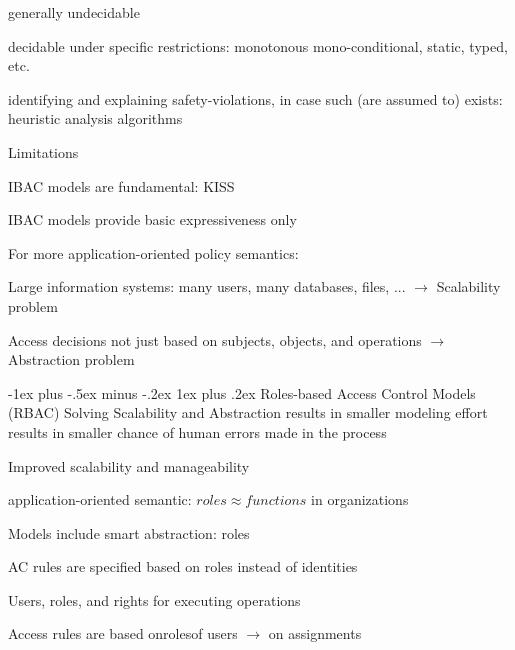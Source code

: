 \documentclass[a4paper]{article}
\makeatletter
\renewcommand{\subsubsection}{\@startsection{subsubsection}{3}{0mm}%
                                {-1ex plus -.5ex minus -.2ex}%
                                {1ex plus .2ex}%
                                {\normalfont\small\bfseries}}
\makeatother
\begin{document}
\begin{multicols}{3}
\begin{itemize*}
\begin{itemize*}
            \item generally undecidable
            \item decidable under specific restrictions: monotonous mono-conditional, static, typed, etc.
            \item identifying and explaining safety-violations, in case such (are assumed to) exists: heuristic analysis algorithms
        \end{itemize*}
        \item Limitations
        \begin{itemize*}
            \item IBAC models are fundamental: KISS
            \item IBAC models provide basic expressiveness only
        \end{itemize*}
        \item For more application-oriented policy semantics:
        \begin{itemize*}
            \item Large information systems: many users, many databases, files, ... $\rightarrow$ Scalability problem
            \item Access decisions not just based on subjects, objects, and operations $\rightarrow$ Abstraction problem
        \end{itemize*}
    \end{itemize*}

    \subsubsection{Roles-based Access Control Models (RBAC)}
    Solving Scalability and Abstraction results in smaller modeling effort results in smaller chance of human errors made in the process
    \begin{itemize*}
        \item Improved scalability and manageability
        \item application-oriented semantic: $roles\approx functions$ in organizations
        \item Models include smart abstraction: roles
        \item AC rules are specified based on roles instead of identities
        \item Users, roles, and rights for executing operations
        \item Access rules are based onrolesof users $\rightarrow$ on assignments
    \end{itemize*}


\end{multicols}
\end{document}
